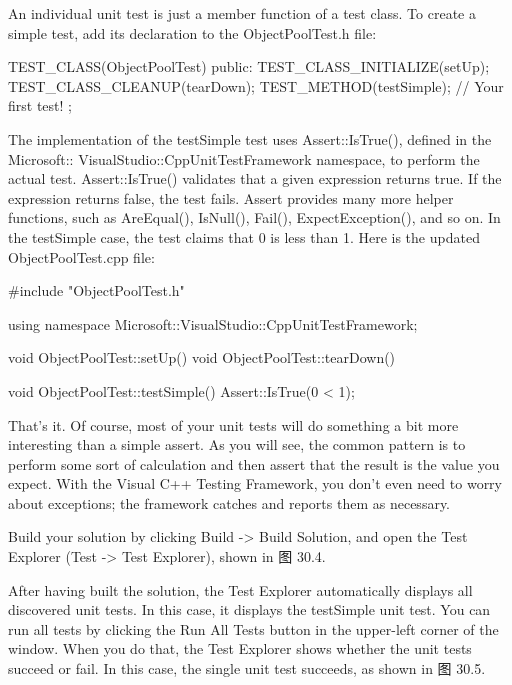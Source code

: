 An individual unit test is just a member function of a test class. To create a simple test, add its declaration to the ObjectPoolTest.h file:

\begin{cpp}
TEST_CLASS(ObjectPoolTest)
{
    public:
        TEST_CLASS_INITIALIZE(setUp);
        TEST_CLASS_CLEANUP(tearDown);
        TEST_METHOD(testSimple); // Your first test!
};
\end{cpp}

The implementation of the testSimple test uses Assert::IsTrue(), defined in the Microsoft:: VisualStudio::CppUnitTestFramework namespace, to perform the actual test. Assert::IsTrue() validates that a given expression returns true. If the expression returns false, the test fails. Assert provides many more helper functions, such as AreEqual(), IsNull(), Fail(), ExpectException(), and so on. In the testSimple case, the test claims that 0 is less than 1. Here is the updated ObjectPoolTest.cpp file:

\begin{cpp}
#include "ObjectPoolTest.h"

using namespace Microsoft::VisualStudio::CppUnitTestFramework;

void ObjectPoolTest::setUp() { }
void ObjectPoolTest::tearDown() { }

void ObjectPoolTest::testSimple()
{
    Assert::IsTrue(0 < 1);
}
\end{cpp}

That’s it. Of course, most of your unit tests will do something a bit more interesting than a simple assert. As you will see, the common pattern is to perform some sort of calculation and then assert that the result is the value you expect. With the Visual C++ Testing Framework, you don’t even need to worry about exceptions; the framework catches and reports them as necessary.


Build your solution by clicking Build -> Build Solution, and open the Test Explorer (Test -> Test Explorer), shown in 图 30.4.


After having built the solution, the Test Explorer automatically displays all discovered unit tests. In this case, it displays the testSimple unit test. You can run all tests by clicking the Run All Tests button in the upper-left corner of the window. When you do that, the Test Explorer shows whether the unit tests succeed or fail. In this case, the single unit test succeeds, as shown in 图 30.5.

